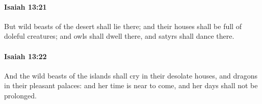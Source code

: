 		\paragraph{Isaiah 13:21} %
			\label{ISAIAH-13-21}

			But wild beasts of the desert shall lie there; and their houses shall be full of doleful creatures; and owls shall dwell there, and satyrs shall dance there.


		\paragraph{Isaiah 13:22} %
			\label{ISAIAH-13-22}

			And the wild beasts of the islands shall cry in their desolate houses, and dragons in their pleasant palaces: and her time is near to come, and her days shall not be prolonged.


